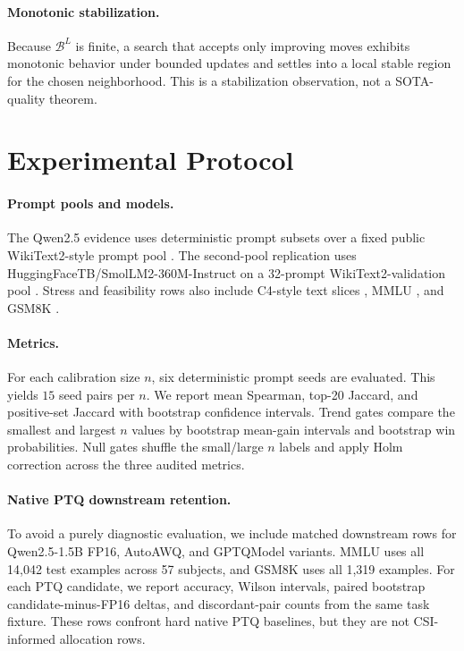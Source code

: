\documentclass[letterpaper]{article}
\begin{document}
\paragraph{Monotonic stabilization.}
Because $\mathcal{B}^L$ is finite, a search that accepts only improving moves
exhibits monotonic behavior under bounded updates and settles into a local
stable region for the chosen neighborhood. This is a stabilization observation,
not a SOTA-quality theorem.

\section{Experimental Protocol}

\paragraph{Prompt pools and models.}
The Qwen2.5 evidence uses deterministic prompt subsets over a fixed public
WikiText2-style prompt pool \citep{merity2017wikitext,qwen25}. The second-pool
replication uses HuggingFaceTB/SmolLM2-360M-Instruct on a 32-prompt
WikiText2-validation pool \citep{smollm2}. Stress and feasibility rows also
include C4-style text slices \citep{c4}, MMLU \citep{hendrycks2021mmlu}, and
GSM8K \citep{cobbe2021gsm8k}.

\paragraph{Metrics.}
For each calibration size $n$, six deterministic prompt seeds are evaluated.
This yields $15$ seed pairs per $n$. We report mean Spearman, top-20 Jaccard,
and positive-set Jaccard with bootstrap confidence intervals. Trend gates
compare the smallest and largest $n$ values by bootstrap mean-gain intervals
and bootstrap win probabilities. Null gates shuffle the small/large $n$ labels and
apply Holm correction across the three audited metrics.

\paragraph{Native PTQ downstream retention.}
To avoid a purely diagnostic evaluation, we include matched downstream rows for
Qwen2.5-1.5B FP16, AutoAWQ, and GPTQModel variants. MMLU uses all 14,042 test
examples across 57 subjects, and GSM8K uses all 1,319 examples. For each PTQ
candidate, we report accuracy, Wilson intervals, paired bootstrap
candidate-minus-FP16 deltas, and discordant-pair counts from the same task
fixture. These rows confront hard native PTQ baselines, but they are not
CSI-informed allocation rows.
\end{document}
